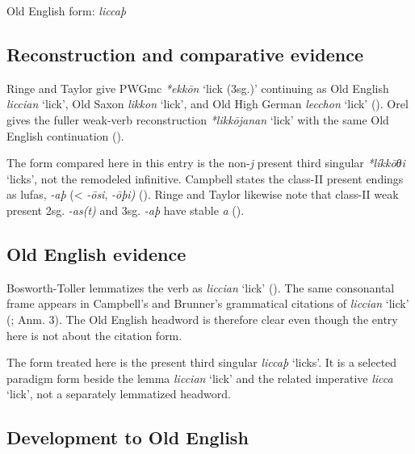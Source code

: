 \documentclass[
  british,
  a4paper,
  openany]{book}
\providecommand{\Recon}[1]{\emph{*#1}}
{\catcode`→=\active \global\def→{\ensuremath{\rightarrow}}}
\providecommand{\Recon}[1]{\emph{*#1}}
{\catcode`→=\active \global\def→{\ensuremath{\rightarrow}}}
\begin{document}
Old English form: \emph{liccaþ}

\subsection{Reconstruction and comparative
evidence}\label{reconstruction-and-comparative-evidence-133}

Ringe and Taylor give PWGmc \Recon{ekkōn} `lick (3sg.)' continuing as
Old English {\emph{liccian}} `lick', Old Saxon {\emph{likkon}} `lick',
and Old High German {\emph{lecchon}} `lick'
(). Orel gives
the fuller weak-verb reconstruction {\Recon{likkōjanan} `lick'} with the
same Old English continuation ().

The form compared here in this entry is the non-\emph{j} present third
singular \Recon{líkkōθi} `licks', not the remodeled infinitive. Campbell
states the class-II present endings as lufas, \emph{-aþ} (\textless{}
\emph{-ōsi}, \emph{-ōþi)} (). Ringe and Taylor likewise note that class-II weak present
2sg. \emph{-as(t)} and 3sg. \emph{-aþ} have stable \emph{a}
().

\subsection{Old English evidence}\label{old-english-evidence-133}

Bosworth-Toller lemmatizes the verb as \emph{liccian} `lick'
(). The
same consonantal frame appears in Campbell's and Brunner's grammatical
citations of \emph{liccian} `lick' (;  Anm. 3). The Old English headword is therefore clear even
though the entry here is not about the citation form.

The form treated here is the present third singular {\emph{liccaþ}}
`licks'. It is a selected paradigm form beside the lemma
{\emph{liccian}} `lick' and the related imperative {\emph{licca}}
`lick', not a separately lemmatized headword.

\subsection{Development to Old
English}\label{development-to-old-english-133}
\end{document}
